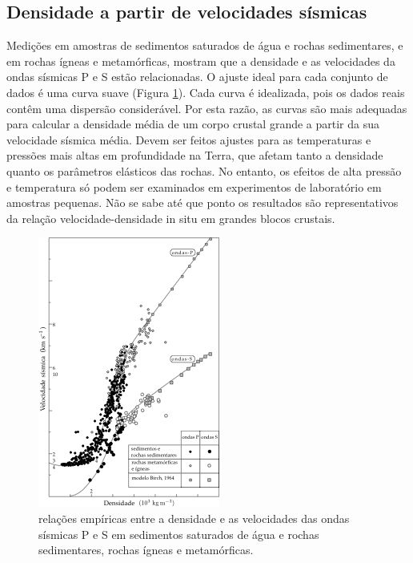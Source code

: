 \documentclass[]{book}
\theoremstyle{definition}
\theoremstyle{definition}
\theoremstyle{definition}
\theoremstyle{remark}
\begin{document}
\hypertarget{densidade-a-partir-de-velocidades-sismicas}{%
\subsection{Densidade a partir de velocidades sísmicas}\label{densidade-a-partir-de-velocidades-sismicas}}

Medições em amostras de sedimentos saturados de água e rochas sedimentares, e em rochas ígneas e metamórficas, mostram que a densidade e as velocidades da ondas sísmicas P e S estão relacionadas. O ajuste ideal para cada conjunto de dados é uma curva suave (Figura \ref{fig:densidadePS}). Cada curva é idealizada, pois os dados reais contêm uma dispersão considerável. Por esta razão, as curvas são mais adequadas para calcular a densidade média de um corpo crustal grande a partir da sua velocidade sísmica média. Devem ser feitos ajustes para as temperaturas e pressões mais altas em profundidade na Terra, que afetam tanto a densidade quanto os parâmetros elásticos das rochas. No entanto, os efeitos de alta pressão e temperatura só podem ser examinados em experimentos de laboratório em amostras pequenas. Não se sabe até que ponto os resultados são representativos da relação velocidade-densidade in situ em grandes blocos crustais.

\begin{figure}

{\centering \includegraphics[width=0.6\linewidth]{fig/Fig_02.32} 

}

\caption{relações empíricas entre a densidade e as velocidades das ondas sísmicas P e S em sedimentos saturados de água e rochas sedimentares, rochas ígneas e metamórficas.}\label{fig:densidadePS}
\end{figure}
\end{document}
